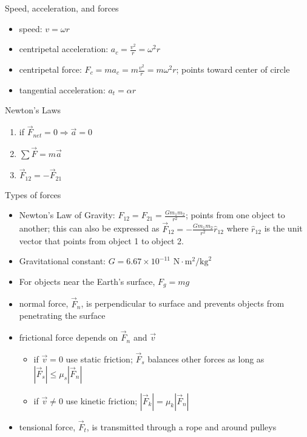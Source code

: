 \documentclass[11pt,letterpaper]{article}
\begin{document}
\clearpage
\noindent Speed, acceleration, and forces
\begin{itemize}
\item speed: $v=\omega{r}$
\item centripetal acceleration: $a_c=\displaystyle\frac{v^2}{r}=\omega^2r$
\item centripetal force: $F_c=ma_c=m\displaystyle\frac{v^2}{r}=m\omega^2r$; points toward center of circle
\item tangential acceleration: $a_t=\alpha{r}$
\end{itemize}
Newton's Laws
\begin{enumerate}
\item if $\vec{F}_{net}=0\Rightarrow \vec{a}=0$
\item $\displaystyle\sum\vec{F}=m\vec{a}$
\item $\vec{F}_{12}=-\vec{F}_{21}$
\end{enumerate}
Types of forces
\begin{itemize}
\item Newton's Law of Gravity: $F_{12}=F_{21}=\displaystyle\frac{Gm_1m_2}{r^2}$; points from one object to another; this can also be expressed as $\vec{F}_{12}=\displaystyle-\frac{Gm_1m_2}{r^2}\hat{r}_{12}$ where $\hat{r}_{12}$ is the unit vector that points from object 1 to object 2.
\item Gravitational constant: $G=6.67\times{10}^{-11}\mbox{ N}\cdot\mbox{m}^2/\mbox{kg}^2$
\item For objects near the Earth's surface, $F_g=mg$
\item normal force, $\vec{F}_n$, is perpendicular to surface and prevents objects from penetrating the surface
\item frictional force depends on $\vec{F}_n$ and $\vec{v}$
\begin{itemize}
\item if $\vec{v}=0$ use static friction; $\vec{F}_s$ balances other forces as long as $\left|\vec{F}_s\right|\leq\mu_s\left|\vec{F}_n\right|$
\item if $\vec{v}\neq{0}$ use kinetic friction; $\left|\vec{F}_k\right|=\mu_k\left|\vec{F}_n\right|$
\end{itemize}
\item tensional force, $\vec{F}_t$, is transmitted through a rope and around pulleys
\end{itemize}
\end{document}
